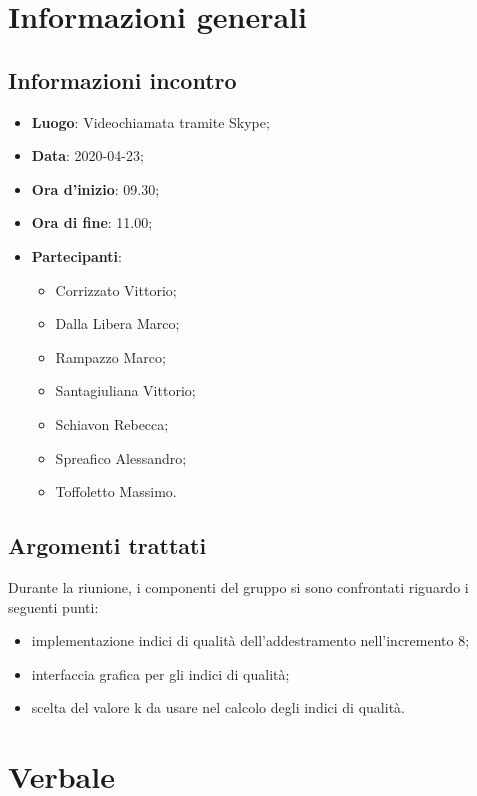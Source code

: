 \section{Informazioni generali}
    \subsection{Informazioni incontro}
        \begin{itemize}
            \item \textbf{Luogo}: Videochiamata tramite Skype;
            \item \textbf{Data}: 2020-04-23;
            \item \textbf{Ora d'inizio}: 09.30;
            \item \textbf{Ora di fine}: 11.00;
            \item \textbf{Partecipanti}: 
            \begin{itemize}
                \item Corrizzato Vittorio;
                \item Dalla Libera Marco;
                \item Rampazzo Marco;
                \item Santagiuliana Vittorio;
                \item Schiavon Rebecca;
                \item Spreafico Alessandro;
                \item Toffoletto Massimo.
            \end{itemize}
        \end{itemize}
    \subsection{Argomenti trattati}
    Durante la riunione, i componenti del gruppo si sono confrontati riguardo i seguenti punti:
    \begin{itemize}
    	\item implementazione indici di qualità dell'addestramento nell'incremento 8;
    	\item interfaccia grafica per gli indici di qualità;
    	\item scelta del valore k da usare nel calcolo degli indici di qualità.
    \end{itemize}
    
\section{Verbale}
